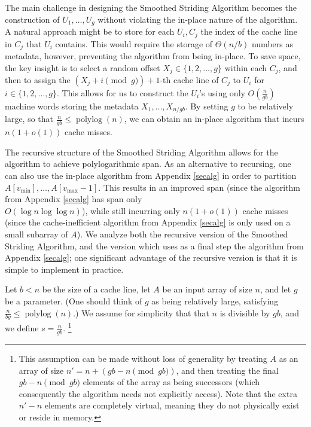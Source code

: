 \documentclass[sigconf, 10pt, nonacm]{acmart}
\renewcommand{\paragraph}[1]{\vspace{0.09in}\noindent{\bf \boldmath #1.}}
\theoremstyle{remark}
\theoremstyle{remark}
\begin{document}
The main challenge in designing the Smoothed Striding Algorithm
becomes the construction of $U_1, \ldots, U_{g}$ without
violating the in-place nature of the algorithm. A natural approach
might be to store for each $U_i, C_j$ the index of the cache
line in $C_j$ that $U_i$ contains. This would require the storage of
$\Theta(n / b)$ numbers as metadata, however, preventing the algorithm
from being in-place. To save space, the key insight is to select a
random offset $X_j \in \{1, 2, \ldots, g\}$ within each $C_j$, and
then to assign the $(X_j + i \pmod g) + 1$-th cache line of $C_j$ to
$U_i$ for $i \in \{1, 2, \ldots, g\}$. This allows for us to construct
the $U_i$'s using only $O\left(\frac{n}{gb}\right)$ machine words
storing the metadata $X_1, \ldots, X_{n / gb}$. By setting $g$ to
be relatively large, so that $\frac{n}{gb} \le
\operatorname{polylog}(n)$, we can obtain an in-place algorithm that
incurs $n (1 + o(1))$ cache misses.

The recursive structure of the Smoothed Striding Algorithm allows for
the algorithm to achieve polylogarithmic span. As an alternative to
recursing, one can also use the in-place algorithm from Appendix
\ref{secalg} in order to partition \\ $A[v_{\text{min}}], \ldots,
  A[v_{\text{max}} - 1]$. This results in an improved span (since the
algorithm from Appendix \ref{secalg} has span only \\ $O(\log n \log \log
n)$), while still incurring only $n (1 + o(1))$ cache misses (since
the cache-inefficient algorithm from Appendix \ref{secalg} is only used
on a small subarray of $A$). We analyze both the recursive version of
the Smoothed Striding Algorithm, and the version which uses as a final
step the algorithm from Appendix \ref{secalg}; one significant advantage
of the recursive version is that it is simple to implement in
practice.

\paragraph{Formal Algorithm Description} Let $b < n$ be the size of a cache line, let $A$ be an input array of size
$n$, and let $g$ be a parameter. (One should think of $g$ as being
relatively large, satisfying $\frac{n}{bg} \le
\operatorname{polylog}(n)$.)  We assume for simplicity that that $n$
is divisible by $gb$, and we define $s = \frac{n}{gb}$.
\footnote{This assumption can be made without loss of generality by treating $A$ as
an array of size $n' = n + {(gb - n \pmod {gb})}$, and then treating
the final $gb - n \pmod {gb}$ elements of the array as being
successors (which consequently the algorithm needs not explicitly
access). Note that the extra $n' - n$ elements are completely virtual, meaning they do not physically exist or reside in memory.
}
\end{document}
